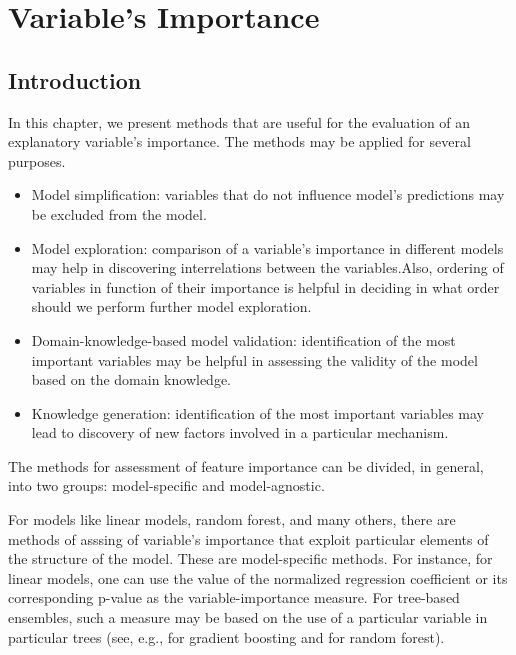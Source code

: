 \documentclass[12pt,]{krantz}
\providecommand{\tightlist}{%
  \setlength{\itemsep}{0pt}\setlength{\parskip}{0pt}}
\begin{document}
\hypertarget{featureImportance}{%
\section{Variable's Importance}\label{featureImportance}}

\hypertarget{featureImportanceIntro}{%
\subsection{Introduction}\label{featureImportanceIntro}}

In this chapter, we present methods that are useful for the evaluation of an explanatory variable's importance. The methods may be applied for several purposes.

\begin{itemize}
\tightlist
\item
  Model simplification: variables that do not influence model's predictions may be excluded from the model.
\item
  Model exploration: comparison of a variable's importance in different models may help in discovering interrelations between the variables.Also, ordering of variables in function of their importance is helpful in deciding in what order should we perform further model exploration.
\item
  Domain-knowledge-based model validation: identification of the most important variables may be helpful in assessing the validity of the model based on the domain knowledge.
\item
  Knowledge generation: identification of the most important variables may lead to discovery of new factors involved in a particular mechanism.
\end{itemize}

The methods for assessment of feature importance can be divided, in general, into two groups: model-specific and model-agnostic.

For models like linear models, random forest, and many others, there are methods of asssing of variable's importance that exploit particular elements of the structure of the model. These are model-specific methods. For instance, for linear models, one can use the value of the normalized regression coefficient or its corresponding p-value as the variable-importance measure. For tree-based ensembles, such a measure may be based on the use of a particular variable in particular trees (see, e.g., \citep{xgboostExplainer} for gradient boosting and \citep{randomForestExplainer} for random forest).
\end{document}
